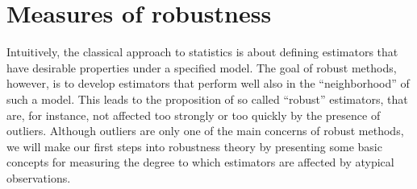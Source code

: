 \section{Measures of robustness}

Intuitively, the classical approach to statistics is about defining estimators
that have desirable properties under a specified model. The goal of
robust methods, however, is to develop estimators that perform well also in the
“neighborhood” of such a model. This leads to the proposition of so called
“robust” estimators, that are, for instance, not affected too strongly or too
quickly by the presence of outliers. Although outliers are only one of
the main concerns of robust methods, we will make our first steps into
robustness theory by presenting some basic concepts for measuring the degree to
which estimators are affected by atypical observations.


